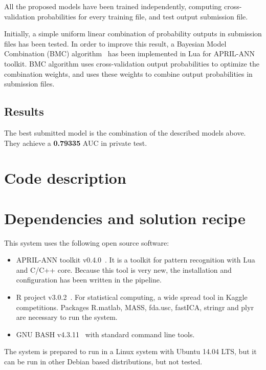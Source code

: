\documentclass[a4paper,english,twoside]{article}
\begin{document}
All the proposed models have been trained independently, computing
cross-validation probabilities for every training file, and test output
submission file.

Initially, a simple uniform linear combination of probability outputs in
submission files has been tested. In order to improve this result, a Bayesian
Model Combination (BMC) algorithm~\cite{2011:monteith:ijcnn} has been
implemented in Lua for APRIL-ANN~\cite{aprilann} toolkit. BMC algorithm uses
cross-validation output probabilities to optimize the combination weights, and
uses these weights to combine output probabilities in submission files.

\subsection{Results}\label{results}

The best submitted model is the combination of the described models
above. They achieve a \textbf{0.79335} AUC in private test.

\section{Code description}\label{code-description}

\section{Dependencies and solution recipe}\label{dependencies}

This system uses the following open source software:

\begin{itemize}
\item APRIL-ANN toolkit v0.4.0~\cite{aprilann}.
  It is a toolkit for pattern recognition with Lua and C/C++ core.
  Because this tool is very new, the installation and configuration has
  been written in the pipeline.
\item R project v3.0.2~\cite{Rproject}. For statistical
  computing, a wide spread tool in Kaggle competitions. Packages
  R.matlab, MASS, fda.usc, fastICA, stringr and plyr are necessary to
  run the system.
\item GNU BASH v4.3.11~\cite{bash} with standard command line tools.
\end{itemize}

The system is prepared to run in a Linux system with Ubuntu 14.04 LTS, but it
can be run in other Debian based distributions, but not tested.
\end{document}
